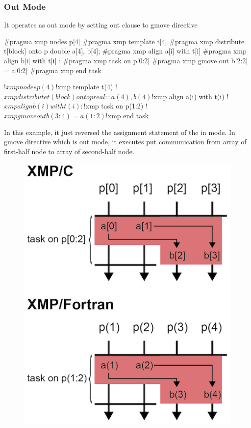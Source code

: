 \subsubsection{Out Mode}

It operates as out mode by setting out clause to gmove directive

\begin{XCexample}
#pragma xmp nodes p[4]
#pragma xmp template t[4]
#pragma xmp distribute t[block] onto p
double a[4], b[4];
#pragma xmp align a[i] with t[i]
#pragma xmp align b[i] with t[i]
   :
#pragma xmp task on p[0:2]
#pragma xmp gmove out
  b[2:2] = a[0:2]
#pragma xmp end task
\end{XCexample}

\begin{XFexample}
!$xmp nodes p(4)
!$xmp template t(4)
!$xmp distribute t(block) onto p
real :: a(4), b(4)
!$xmp align a(i) with t(i)
!$xmp align b(i) with t(i)
   :
!$xmp task on p(1:2)
!$xmp gmove out
  b(3:4) = a(1:2)
!$xmp end task
\end{XFexample}

In this example, it just reversed the assignment statement of the in
mode. In gmove directive which is out mode, it executes put
communication from array of first-half node to array of second-half
node.

\begin{figure}
  \centering
  \includegraphics{figs/gmove_out.png}
\end{figure}


